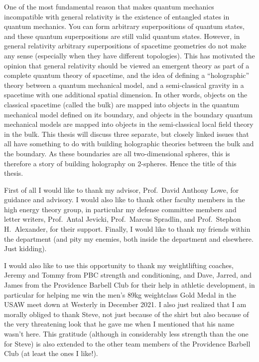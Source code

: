 \documentclass{brownthesis}
\begin{document}
One of the most fundamental reason that makes quantum mechanics incompatible with general relativity is the existence of entangled states in quantum mechanics. You can form arbitrary superpositions of quantum states, and these quantum superpositions are still valid quantum states. However, in general relativity arbitrary superpositions of spacetime geometries do not make any sense (especially when they have different topologies). This has motivated the opinion that general relativity should be viewed an emergent theory as part of a complete quantum theory of spacetime, and the idea of defining a ``holographic'' theory between a quantum mechanical model, and a semi-classical gravity in a spacetime with one additional spatial dimension. In other words, objects on the classical spacetime (called the bulk) are mapped into objects in the quantum mechanical model defined on its boundary, and objects in the boundary quantum mechanical models are mapped into objects in the semi-classical local field theory in the bulk. This thesis will discuss three separate, but closely linked issues that all have something to do with building holographic theories between the bulk and the boundary. As these boundaries are all two-dimensional spheres, this is therefore a story of building holography on 2-spheres. Hence the title of this thesis.

First of all I would like to thank my advisor, Prof.~David Anthony Lowe, for guidance and advisory. I would also like to thank other faculty members in the high energy theory group, in particular my defense committee members and letter writers, Prof.~Antal Jevicki, Prof.~Marcus Spradlin, and Prof.~Stephon H.~Alexander, for their support. Finally, I would like to thank my friends within the department (and pity my enemies, both inside the department and elsewhere. Just kidding).

I would also like to use this opportunity to thank my weightlifting coaches, Jeremy and Tommy from PBC strength and conditioning, and Dave, Jarred, and James from the Providence Barbell Club for their help in athletic development, in particular for helping me win the men's 89kg weightclass Gold Medal in the USAW meet down at Westerly in December 2021. I also just realized that I am morally obliged to thank Steve, not just because of the shirt but also because of the very threatening look that he gave me when I mentioned that his name wasn't here. This gratitude (although in considerably less strength than the one for Steve) is also extended to the other team members of the Providence Barbell Club (at least the ones I like!).
\end{document}
